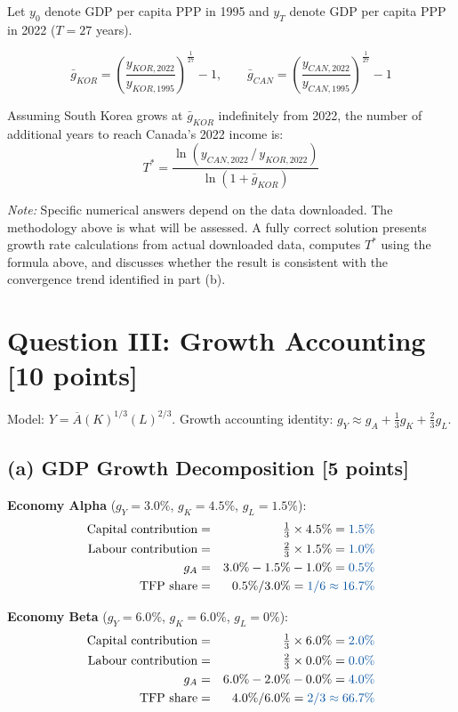 \documentclass[letterpaper,12pt]{article}
\begin{document}
Let $y_0$ denote GDP per capita PPP in 1995 and $y_T$ denote GDP per capita PPP in 2022 ($T = 27$ years).

\[
\bar{g}_{KOR} = \left(\frac{y_{KOR,2022}}{y_{KOR,1995}}\right)^{\!\frac{1}{27}} - 1, \qquad \bar{g}_{CAN} = \left(\frac{y_{CAN,2022}}{y_{CAN,1995}}\right)^{\!\frac{1}{27}} - 1
\]

\noindent Assuming South Korea grows at $\bar{g}_{KOR}$ indefinitely from 2022, the number of additional years to reach Canada's 2022 income is:
\[
T^* = \frac{\ln\!\left(y_{CAN,2022}\,/\,y_{KOR,2022}\right)}{\ln(1+\bar{g}_{KOR})}
\]

\noindent\textit{Note:} Specific numerical answers depend on the data downloaded. The methodology above is what will be assessed. A fully correct solution presents growth rate calculations from actual downloaded data, computes $T^*$ using the formula above, and discusses whether the result is consistent with the convergence trend identified in part (b).


\section*{Question III: Growth Accounting [10 points]}

\noindent Model: $Y = \overline{A}(K)^{1/3}(L)^{2/3}$. Growth accounting identity: $g_Y \approx g_A + \frac{1}{3}g_K + \frac{2}{3}g_L$.

\subsection*{(a) GDP Growth Decomposition [5 points]}

\textbf{Economy Alpha} ($g_Y=3.0\%$, $g_K=4.5\%$, $g_L=1.5\%$):
\begin{eqnarray*}
\text{Capital contribution} &=& \tfrac{1}{3} \times 4.5\% = \textcolor{sol}{1.5\%} \\
\text{Labour contribution}  &=& \tfrac{2}{3} \times 1.5\% = \textcolor{sol}{1.0\%} \\
g_A                         &=& 3.0\% - 1.5\% - 1.0\% = \textcolor{sol}{0.5\%} \\
\text{TFP share}            &=& 0.5\% / 3.0\% = \textcolor{sol}{1/6 \approx 16.7\%}
\end{eqnarray*}

\textbf{Economy Beta} ($g_Y=6.0\%$, $g_K=6.0\%$, $g_L=0\%$):
\begin{eqnarray*}
\text{Capital contribution} &=& \tfrac{1}{3} \times 6.0\% = \textcolor{sol}{2.0\%} \\
\text{Labour contribution}  &=& \tfrac{2}{3} \times 0.0\% = \textcolor{sol}{0.0\%} \\
g_A                         &=& 6.0\% - 2.0\% - 0.0\% = \textcolor{sol}{4.0\%} \\
\text{TFP share}            &=& 4.0\% / 6.0\% = \textcolor{sol}{2/3 \approx 66.7\%}
\end{eqnarray*}
\end{document}
